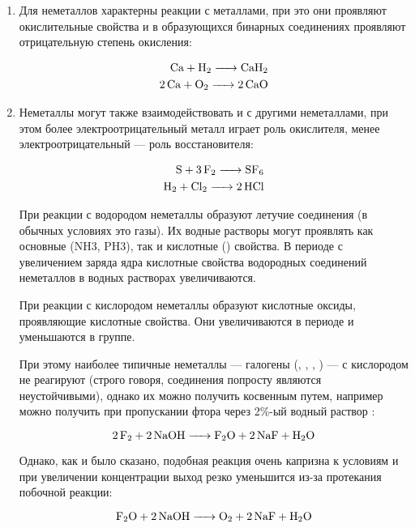 \begin{enumerate}
	\item Для неметаллов характерны реакции с металлами, при это они проявляют окислительные свойства и в образующихся бинарных соединениях проявляют отрицательную степень окисления:
	
	\begin{align}
		\ce{Ca + H2 -> CaH2}\\
		\ce{2 Ca + O2 -> 2CaO}
 	\end{align}

	\item Неметаллы могут также взаимодействовать и с другими неметаллами, при этом более электроотрицательный металл играет роль окислителя, менее электроотрицательный --- роль восстановителя:
	
	\begin{align}
		\ce{S + 3 F2 -> SF6} \\
		\ce{H2 + Cl2 -> 2HCl}
	\end{align}

	При реакции с водородом неметаллы образуют летучие соединения (в обычных условиях это газы). Их водные растворы могут проявлять как основные (NH3, PH3), так и кислотные () свойства. В периоде с увеличением заряда ядра кислотные свойства водородных соединений неметаллов в водных растворах увеличиваются.

	При реакции с кислородом неметаллы образуют кислотные оксиды, проявляющие кислотные свойства. Они увеличиваются в периоде и уменьшаются в группе.

	При этому наиболее типичные неметаллы --- галогены (, , , ) --- с кислородом не реагируют (строго говоря, соединения попросту являются неустойчивыми), однако их можно получить косвенным путем, например  можно получить при пропускании фтора через 2\%-ый водный раствор :
	
	\begin{equation}
		\ce{2F2 + 2NaOH -> F2O + 2NaF + H2O}
	\end{equation}

	Однако, как и было сказано, подобная реакция очень капризна к условиям и при увеличении концентрации  выход  резко уменьшится из-за протекания побочной реакции:
	
	\begin{equation}
		\ce{F2O + 2NaOH -> O2 + 2NaF + H2O}
	\end{equation}
\end{enumerate}